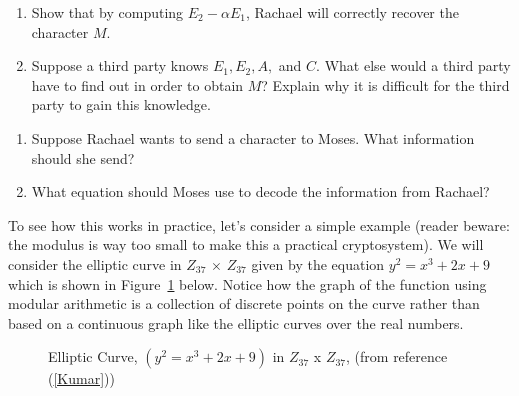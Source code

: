 \begin{exercise}{}
\begin{enumerate}[a]
\item
Show that by computing $E_2 - \alpha E_1$, Rachael will correctly recover  the character $M$.
\item
Suppose a third party knows $E_1, E_2, A,$ and $C$. What else would a third party have to find out in order to obtain $M$?  Explain why it is difficult for the third party to gain this knowledge.
\end{enumerate}
\end{exercise}

\begin{exercise}{}
\begin{enumerate}[a]
\item
Suppose Rachael wants to send a character to Moses.  What information should she send?
\item
What equation should Moses use to decode the information from Rachael?
\end{enumerate}
\end{exercise}

To see how this works in practice, let's consider a simple example (reader beware: the modulus is way too small to make this a practical cryptosystem). We will consider the elliptic curve in $Z_{37}$ $\times$ $Z_{37}$ given by the equation $y^2 = x^3 + 2x + 9$ which is shown in Figure~\ref{fig:DH:DHKE_11} below. Notice how the graph of the function using modular arithmetic is a collection of discrete points on the curve rather than based on a continuous graph like the elliptic curves over the real numbers.

\begin{figure}[htbp]
	  \caption{\label{fig:DH:DHKE_11} Elliptic Curve, $(y^2 = x^3 + 2x + 9)$ in $Z_{37}$ x $Z_{37}$, (from reference (\ref{Kumar}))}
\end{figure}

